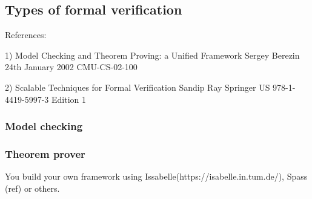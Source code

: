 \subsection{Types of formal verification}



References:

1) Model Checking and Theorem Proving:
a Unified Framework
Sergey Berezin
24th January 2002
CMU-CS-02-100


2) Scalable Techniques for Formal Verification
Sandip Ray
Springer US
978-1-4419-5997-3
Edition 1


\subsubsection{Model checking}


\subsubsection{Theorem prover}

You build your own framework using Issabelle(https://isabelle.in.tum.de/), Spass (ref) or others.


